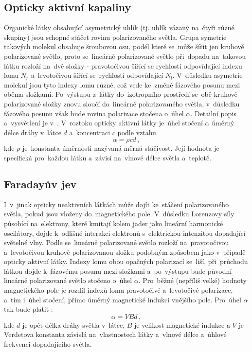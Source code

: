 \documentclass{../concepts/titul_protokol_p/prepareprotokol} %
\begin{document}
\subsection{Opticky aktivní kapaliny}
Organické látky obsahující asymetrický uhlík (tj. uhlík vázaný na~čtyři různé skupiny) jsou schopné stáčet rovinu
polarizovaného světla. Grupa symetrie takových molekul obsahuje šroubovou osu, podél které se~může šířit jen
kruhově polarizované světlo, proto se~lineárně polarizované světlo při~dopadu na~takovou látku rozloží na~dvě
složky - pravotočivou šířící se rychlostí odpovídající indexu lomu $N_r$ a~levotočivou šířící se~rychlostí
odpovídající $N_l$. V~důsledku asymetrie molekul jsou tyto indexy lomu různé, což vede ke~změně fázového posunu
mezi oběma složkami. Po~výstupu z~látky do~izotropního prostředí se~obě kruhově polarizované složky znovu
sloučí do~lineárně polarizovaného světla, v~důsledku fázového posunu však bude rovina polarizace stočena
o~úhel $\alpha$. Detailní popis a~vysvětlení je v~\cite{studijni}. V~roztoku opticky aktivní látky je~úhel stočení
$\alpha$ úměrný délce dráhy v~látce $d$ a~koncentraci $c$ podle vztahu \cite{studijni}
\begin{equation}
    \label{eq:klasicke_staceni}
    \alpha = \rho c d \,,
\end{equation}
kde $\rho$ je~konstanta úměrnosti nazývaná měrná stáčivost. Její hodnota je specifická pro~každou látku
a~závisí na~vlnové délce světla a~teplotě.

\subsection{Faradayův jev}
I~v~jinak opticky neaktivních látkách může dojít ke~stáčení polarizovaného světla, pokud jsou vloženy do~magnetického
pole. V~důsledku Lorenzovy síly působící na~elektrony, které kmitají kolem jader jako lineární harmonické oscilátory,
dojde k~odlišné interakci elektronů s~elektrickou intenzitou dopadající světelné vlny. Podle \cite{studijni}
se~lineárně polarizované světlo rozloží na~pravotočivou a~levotočivou kruhově polarizovanou složku podobným
způsobem jako v~případě opticky aktivní látky. Indexy lomu obou opačných polarizací se~liší, při~průchodu látkou
dojde k~fázovému posunu mezi složkami a~po~výstupu bude původní lineárně polarizované světlo stočeno o~úhel
$\alpha$. Pro~běžné (nepříliš velké) hodnoty magnetického pole je rozdíl indexů lomu pravotočivé a~levotočivé 
polarizace, a~tím i~úhel stočení, přímo úměrný magnetické indukci vnějšího pole. Pro~úhel $\alpha$ tak bude
platit \cite{studijni}:
\begin{equation}
    \label{eq:faraday_staceni}
    \alpha = V B d \,,
\end{equation}
kde $d$ je opět délka dráhy světla v~látce, $B$ je velikost magnetické indukce a $V$ je Verdetova konstanta 
závislá na~vlastnostech látky a~vlnové délce a~úhlové frekvenci dopadajícího světla.
\end{document}
